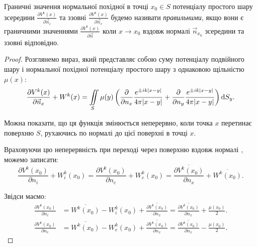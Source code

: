 \begin{definition}
	Граничні значення нормальної похідної в точці $x_0 \in S$ потенціалу простого шару зсередини $\frac{\partial V^k(x)}{\partial \vec n_{i}}$ та ззовні $\frac{\partial V^k(x)}{\partial \vec n_{e}}$ будемо називати \textit{правильними}, якщо вони є граничними значеннями $\frac{\partial V^k(x)}{\partial \vec n}$ коли $x \to x_0$ вздовж нормалі $\vec n_{x_0}$ зсередини та ззовні відповідно.
\end{definition}

\begin{proof}
	Розглянемо вираз, який представляє собою суму потенціалу подвійного шару і нормальної похідної потенціалу простого шару з  однаковою щільністю $\mu(x)$:
	\begin{equation}
		\frac{\partial V^k(x)}{\partial \vec n_x} + W^k(x) = \displaystyle\iint\limits_S \mu(y) \left( \frac{\partial}{\partial n_x} \frac{e^{\pm i k |x - y|}}{4 \pi |x - y|} + \frac{\partial}{\partial n_y} \frac{e^{\pm i k |x - y|}}{4 \pi |x - y|} \right) \mathop{}\!\mathrm{d} S_y.
	\end{equation}

	Можна показати, що ця функція змінюється неперервно, коли точка $x$ перетинає поверхню $S$, рухаючись по нормалі до цієї поверхні в точці $x$. \medskip

	Враховуючи цю неперервність при переході через поверхню вздовж нормалі , можемо записати:
	\begin{equation}
		\frac{\partial V^k(x_0)}{\partial n_{i}} + W_{i}^k(x_0) = \frac{\partial V^k(x_0)}{\partial n_{e}} + W_{e}^k(x_0) = \overline{\frac{\partial V^k(x_0)}{\partial n_x}} + \overline{W^k(x_0)}.
	\end{equation}

	Звідси маємо:
	\begin{align}
		\frac{\partial V^k(x_0)}{\partial n_{i}} &= \overline{W^k(x_0)} - W_{i}^k(x_0) + \overline{\frac{\partial V^k(x_0)}{\partial n_x}} = \overline{\frac{\partial V^k(x_0)}{\partial n_x}} + \frac{\mu(x_0)}{2}. \\
		\frac{\partial V^k(x_0)}{\partial n_{e}} &= \overline{W^k(x_0)} - W_{e}^k(x_0) + \overline{\frac{\partial V^k(x_0)}{\partial n_x}} = \overline{\frac{\partial V^k(x_0)}{\partial n_x}} - \frac{\mu(x_0)}{2}.
	\end{align}
\end{proof}

